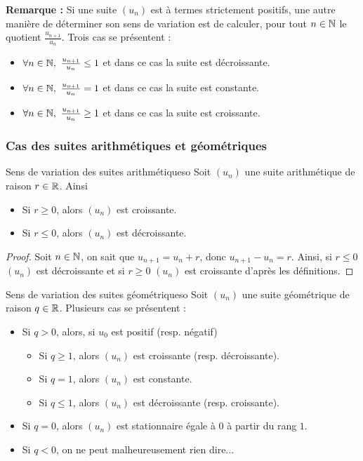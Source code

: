 \textbf{Remarque : } Si une suite $(u_n)$ est à termes strictement positifs, une autre manière de déterminer son sens de variation est de calculer, pour tout $n\in\mathbb{N}$ le quotient $\frac{u_{n+1}}{u_n}$. Trois cas se présentent :

\begin{itemize}
	\item $\forall n\in\mathbb{N},\ \frac{u_{n+1}}{u_n} \leq 1$ et dans ce cas la suite est décroissante.
	\item $\forall n\in\mathbb{N},\ \frac{u_{n+1}}{u_n} = 1$ et dans ce cas la suite est constante.
	\item $\forall n\in\mathbb{N},\ \frac{u_{n+1}}{u_n} \geq 1$ et dans ce cas la suite est croissante.
\end{itemize}

\subsubsection{Cas des suites arithmétiques et géométriques}

\begin{proposition}{Sens de variation des suites arithmétiques}{o}
Soit $(u_n)$ une suite arithmétique de raison $r\in\mathbb{R}$. Ainsi 
\begin{itemize}
	\item Si $r\geq 0$, alors $(u_n)$ est croissante.
	\item Si $r\leq 0$, alors $(u_n)$ est décroissante.
\end{itemize}
\end{proposition}
\begin{proof}
Soit $n\in\mathbb{N}$, on sait que $u_{n+1}=u_n+r$, donc $u_{n+1}-u_n=r$. Ainsi, si $r\leq 0$ $(u_n)$ est décroissante et si $r\geq 0$ $(u_n)$ est croissante d'après les définitions.
\end{proof}

\begin{proposition}{Sens de variation des suites géométriques}{o}
Soit $(u_n)$ une suite géométrique de raison $q\in\mathbb{R}$. Plusieurs cas se présentent : 
\begin{itemize}
	\item Si $q > 0$, alors, si $u_0$ est positif (resp. négatif) 
	\begin{itemize}
		\item Si $q \geq 1$, alors $(u_n)$ est croissante (resp. décroissante).
		\item Si $q = 1$, alors $(u_n)$ est constante.
		\item Si $q \leq 1$, alors $(u_n)$ est décroissante (resp. croissante).
	\end{itemize}
	\item Si $q = 0$, alors $(u_n)$ est stationnaire égale à $0$ à partir du rang $1$.
	\item Si $q < 0$, on ne peut malheureusement rien dire...
\end{itemize}
\end{proposition}

